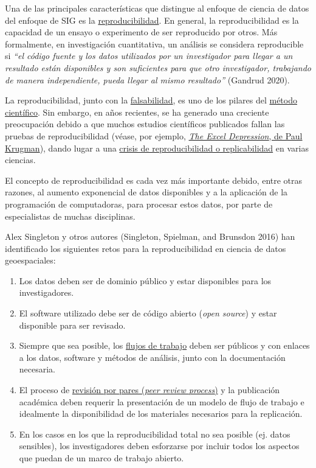 \documentclass[
  letterpaper,
  DIV=11,
  numbers=noendperiod]{scrreprt}
\providecommand{\tightlist}{%
  \setlength{\itemsep}{0pt}\setlength{\parskip}{0pt}}\usepackage{longtable,booktabs,array}
\begin{document}
Una de las principales características que distingue al enfoque de
ciencia de datos del enfoque de SIG es la
\href{https://es.wikipedia.org/wiki/Reproducibilidad_y_repetibilidad}{reproducibilidad}.
En general, la reproducibilidad es la capacidad de un ensayo o
experimento de ser reproducido por otros. Más formalmente, en
investigación cuantitativa, un análisis se considera reproducible si
\emph{``el código fuente y los datos utilizados por un investigador para
llegar a un resultado están disponibles y son suficientes para que otro
investigador, trabajando de manera independiente, pueda llegar al mismo
resultado''} (Gandrud 2020).

La reproducibilidad, junto con la
\href{https://es.wikipedia.org/wiki/Falsabilidad}{falsabilidad}, es uno
de los pilares del
\href{https://es.wikipedia.org/wiki/M\%C3\%A9todo_cient\%C3\%ADfico}{método
científico}. Sin embargo, en años recientes, se ha generado una
creciente preocupación debido a que muchos estudios científicos
publicados fallan las pruebas de reproducibilidad (véase, por ejemplo,
\href{https://www.nytimes.com/2013/04/19/opinion/krugman-the-excel-depression.html}{\emph{The
Excel Depression}, de Paul Krugman}), dando lugar a una
\href{https://es.wikipedia.org/wiki/Crisis_de_replicaci\%C3\%B3n}{crisis
de reproducibilidad o replicabilidad} en varias ciencias.

El concepto de reproducibilidad es cada vez más importante debido, entre
otras razones, al aumento exponencial de datos disponibles y a la
aplicación de la programación de computadoras, para procesar estos
datos, por parte de especialistas de muchas disciplinas.

Alex Singleton y otros autores (Singleton, Spielman, and Brunsdon 2016)
han identificado los siguientes retos para la reproducibilidad en
ciencia de datos geoespaciales:

\begin{enumerate}
\def\labelenumi{\arabic{enumi}.}
\tightlist
\item
  Los datos deben ser de dominio público y estar disponibles para los
  investigadores.
\item
  El software utilizado debe ser de código abierto (\emph{open source})
  y estar disponible para ser revisado.
\item
  Siempre que sea posible, los
  \href{https://es.wikipedia.org/wiki/Flujo_de_trabajo}{flujos de
  trabajo} deben ser públicos y con enlaces a los datos, software y
  métodos de análisis, junto con la documentación necesaria.
\item
  El proceso de
  \href{https://es.wikipedia.org/wiki/Revisi\%C3\%B3n_por_pares}{revisión
  por pares (\emph{peer review process})} y la publicación académica
  deben requerir la presentación de un modelo de flujo de trabajo e
  idealmente la disponibilidad de los materiales necesarios para la
  replicación.
\item
  En los casos en los que la reproducibilidad total no sea posible (ej.
  datos sensibles), los investigadores deben esforzarse por incluir
  todos los aspectos que puedan de un marco de trabajo abierto.
\end{enumerate}
\end{document}
